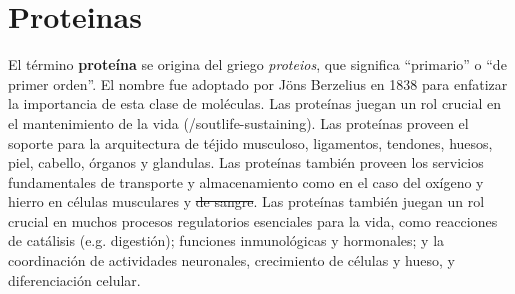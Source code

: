 \section{Proteinas}
\cite{tamar}
El término \textbf{proteína} se origina del griego \textit{proteios},
que significa ``primario'' o ``de primer orden''. El nombre fue
adoptado por Jöns Berzelius en 1838 para enfatizar la importancia de
esta clase de moléculas. Las proteínas juegan un rol crucial en el
mantenimiento de la vida (/sout{life-sustaining}). Las proteínas
proveen el soporte para la arquitectura de téjido musculoso,
ligamentos, tendones, huesos, piel, cabello, órganos y glandulas. Las
proteínas también proveen los servicios fundamentales de transporte y
almacenamiento como en el caso del oxígeno y hierro en células
musculares y \sout{de sangre}. Las proteínas también juegan un rol
crucial en muchos procesos regulatorios esenciales para la vida, como
reacciones de catálisis (e.g. digestión); funciones inmunológicas y
hormonales;  y la coordinación de actividades neuronales, crecimiento
de células y hueso, y diferenciación celular.

